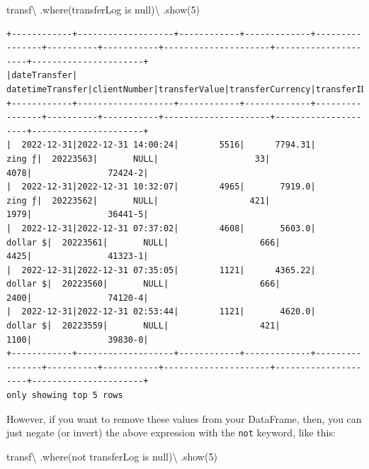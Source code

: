\documentclass[
  11pt,
  letterpaper,
  DIV=11,
  numbers=noendperiod]{scrreprt}
\newenvironment{Shaded}{\begin{snugshade}}{\end{snugshade}}
\newcommand{\DecValTok}[1]{\textcolor[rgb]{0.68,0.00,0.00}{#1}}
\newcommand{\NormalTok}[1]{\textcolor[rgb]{0.00,0.23,0.31}{#1}}
\newcommand{\OperatorTok}[1]{\textcolor[rgb]{0.37,0.37,0.37}{#1}}
\newcommand{\StringTok}[1]{\textcolor[rgb]{0.13,0.47,0.30}{#1}}
\begin{document}
\begin{Shaded}
\begin{Highlighting}[]
\NormalTok{transf}\OperatorTok{\textbackslash{}}
\NormalTok{  .where(}\StringTok{\textquotesingle{}transferLog is null\textquotesingle{}}\NormalTok{)}\OperatorTok{\textbackslash{}}
\NormalTok{  .show(}\DecValTok{5}\NormalTok{)}
\end{Highlighting}
\end{Shaded}

\begin{verbatim}
+------------+-------------------+------------+-------------+----------------+----------+-----------+---------------------+---------------------+----------------------+
|dateTransfer|   datetimeTransfer|clientNumber|transferValue|transferCurrency|transferID|transferLog|destinationBankNumber|destinationBankBranch|destinationBankAccount|
+------------+-------------------+------------+-------------+----------------+----------+-----------+---------------------+---------------------+----------------------+
|  2022-12-31|2022-12-31 14:00:24|        5516|      7794.31|          zing ƒ|  20223563|       NULL|                   33|                 4078|               72424-2|
|  2022-12-31|2022-12-31 10:32:07|        4965|       7919.0|          zing ƒ|  20223562|       NULL|                  421|                 1979|               36441-5|
|  2022-12-31|2022-12-31 07:37:02|        4608|       5603.0|        dollar $|  20223561|       NULL|                  666|                 4425|               41323-1|
|  2022-12-31|2022-12-31 07:35:05|        1121|      4365.22|        dollar $|  20223560|       NULL|                  666|                 2400|               74120-4|
|  2022-12-31|2022-12-31 02:53:44|        1121|       4620.0|        dollar $|  20223559|       NULL|                  421|                 1100|               39830-0|
+------------+-------------------+------------+-------------+----------------+----------+-----------+---------------------+---------------------+----------------------+
only showing top 5 rows
\end{verbatim}

However, if you want to remove these values from your DataFrame, then,
you can just negate (or invert) the above expression with the
\texttt{not} keyword, like this:

\begin{Shaded}
\begin{Highlighting}[]
\NormalTok{transf}\OperatorTok{\textbackslash{}}
\NormalTok{  .where(}\StringTok{\textquotesingle{}not transferLog is null\textquotesingle{}}\NormalTok{)}\OperatorTok{\textbackslash{}}
\NormalTok{  .show(}\DecValTok{5}\NormalTok{)}
\end{Highlighting}
\end{Shaded}
\end{document}
